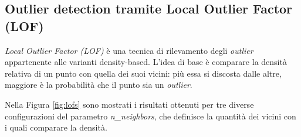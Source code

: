 \documentclass[a4paper]{article}
\begin{document}
\subsection{Outlier detection tramite Local Outlier Factor (LOF)}

\textit{Local Outlier Factor (LOF)} è una tecnica di rilevamento degli \textit{outlier} appartenente alle varianti density-based. L'idea di base è comparare la densità relativa di un punto con quella dei suoi vicini: più essa si discosta dalle altre, maggiore è la probabilità che il punto sia un \textit{outlier}.

Nella Figura \ref{fig:lofs} sono mostrati i risultati ottenuti per tre diverse configurazioni del parametro \textit{n\_neighbors}, che definisce la quantità dei vicini  con i quali comparare la densità.
\end{document}

